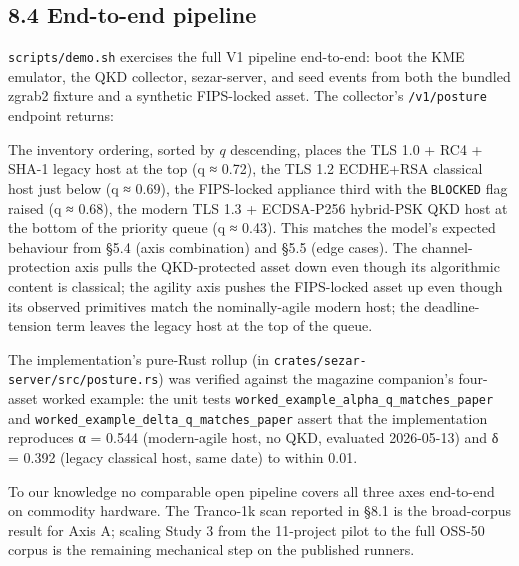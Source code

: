 \subsection{8.4 End-to-end pipeline}\label{end-to-end-pipeline}

\texttt{scripts/demo.sh} exercises the full V1 pipeline end-to-end: boot
the KME emulator, the QKD collector, sezar-server, and seed events from
both the bundled zgrab2 fixture and a synthetic FIPS-locked asset. The
collector's \texttt{/v1/posture} endpoint returns:

\begin{Shaded}
\begin{Highlighting}[]
\FunctionTok{\{}
  \FunctionTok{:} \FunctionTok{,}
  \FunctionTok{:} \FunctionTok{,}
  \FunctionTok{:} \FunctionTok{,}
  \FunctionTok{:} \FunctionTok{,}
  \FunctionTok{:} 
\FunctionTok{\}}
\end{Highlighting}
\end{Shaded}

The inventory ordering, sorted by \(q\) descending, places the TLS 1.0 +
RC4 + SHA-1 legacy host at the top (q ≈ 0.72), the TLS 1.2 ECDHE+RSA
classical host just below (q ≈ 0.69), the FIPS-locked appliance third
with the \texttt{BLOCKED} flag raised (q ≈ 0.68), the modern TLS 1.3 +
ECDSA-P256 hybrid-PSK QKD host at the bottom of the priority queue (q ≈
0.43). This matches the model's expected behaviour from §5.4 (axis
combination) and §5.5 (edge cases). The channel-protection axis pulls
the QKD-protected asset down even though its algorithmic content is
classical; the agility axis pushes the FIPS-locked asset up even though
its observed primitives match the nominally-agile modern host; the
deadline-tension term leaves the legacy host at the top of the queue.

The implementation's pure-Rust rollup (in
\texttt{crates/sezar-server/src/posture.rs}) was verified against the
magazine companion's four-asset worked example: the unit tests
\texttt{worked\_example\_alpha\_q\_matches\_paper} and
\texttt{worked\_example\_delta\_q\_matches\_paper} assert that the
implementation reproduces α = 0.544 (modern-agile host, no QKD,
evaluated 2026-05-13) and δ = 0.392 (legacy classical host, same date)
to within 0.01.

To our knowledge no comparable open pipeline covers all three axes
end-to-end on commodity hardware. The Tranco-1k scan reported in §8.1 is
the broad-corpus result for Axis A; scaling Study 3 from the 11-project
pilot to the full OSS-50 corpus is the remaining mechanical step on the
published runners.

